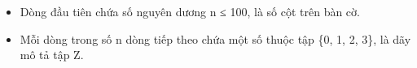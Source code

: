 \begin{itemize}
	\item     Dòng đầu tiên chứa số nguyên dương n ≤ 100, là số cột trên bàn cờ.   
	\item     Mỗi dòng trong số n dòng tiếp theo chứa một số thuộc tập \{0, 1, 2, 3\}, là dãy mô tả tập Z.   
\end{itemize}